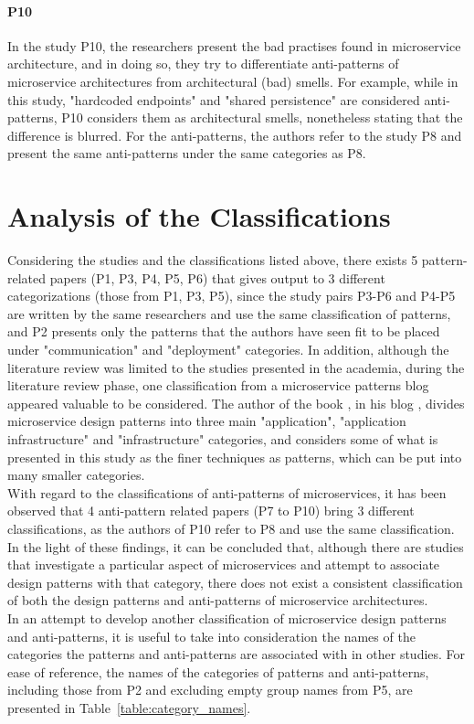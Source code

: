 \documentclass{Configuration_Files/PoliMi3i_thesis}
\begin{document}
\paragraph{P10} In the study P10, the researchers present the bad practises found in microservice architecture, and in doing so, they try to differentiate anti-patterns of microservice architectures from architectural (bad) smells.
For example, while in this study, "hardcoded endpoints" and "shared persistence" are considered anti-patterns, P10 considers them as architectural smells, nonetheless stating that the difference is blurred.
For the anti-patterns, the authors refer to the study P8 and present the same anti-patterns under the same categories as P8.

\section{Analysis of the Classifications}
\label{sec:analysis_of_class}

Considering the studies and the classifications listed above, there exists 5 pattern-related papers (P1, P3, P4, P5, P6) that gives output to 3 different categorizations (those from P1, P3, P5), since the study pairs P3-P6 and P4-P5 are written by the same researchers and use the same classification of patterns, and P2 presents only the patterns that the authors have seen fit to be placed under "communication" and "deployment" categories.
In addition, although the literature review was limited to the studies presented in the academia, during the literature review phase, one classification from a microservice patterns blog appeared valuable to be considered.
The author of the book \cite{richardson_book}, in his blog \cite{blogtaxonomy}, divides microservice design patterns into three main "application", "application infrastructure" and "infrastructure" categories, and considers some of what is presented in this study as the finer techniques as patterns, which can be put into many smaller categories.
\\
With regard to the classifications of anti-patterns of microservices, it has been observed that 4 anti-pattern related papers (P7 to P10) bring 3 different classifications, as the authors of P10 refer to P8 and use the same classification.
\\
In the light of these findings, it can be concluded that, although there are studies that investigate a particular aspect of microservices and attempt to associate design patterns with that category, there does not exist a consistent classification of both the design patterns and anti-patterns of microservice architectures.
\\
In an attempt to develop another classification of microservice design patterns and anti-patterns, it is useful to take into consideration the names of the categories the patterns and anti-patterns are associated with in other studies.
For ease of reference, the names of the categories of patterns and anti-patterns, including those from P2 and excluding empty group names from P5, are presented in Table~\ref{table:category_names}. 
\end{document}
